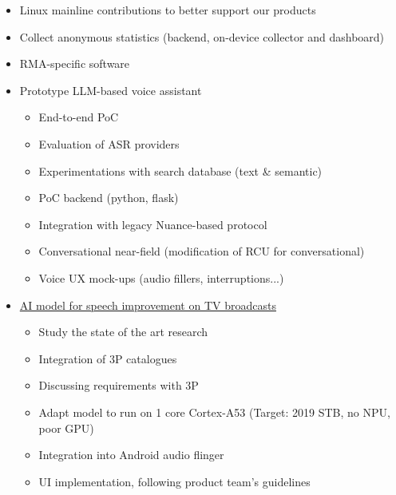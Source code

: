 \documentclass[12pt,a4paper,sans]{moderncv}        %
\begin{document}
{\begin{itemize}
        \item Linux mainline contributions to better support our products
        \item Collect anonymous statistics (backend, on-device collector and dashboard)
        \item RMA-specific software
        \item Prototype LLM-based voice assistant
            \begin{itemize}
                \item End-to-end PoC
                \item Evaluation of ASR providers
                \item Experimentations with search database (text \& semantic)
                \item PoC backend (python, flask)
                \item Integration with legacy Nuance-based protocol
                \item Conversational near-field (modification of RCU for conversational)
                \item Voice UX mock-ups (audio fillers, interruptions...)
            \end{itemize}
        \item \href{https://github.com/phhusson/speechseparation}{AI model for speech improvement on TV broadcasts}
            \begin{itemize}
                \item Study the state of the art research
                \item Integration of 3P catalogues
                \item Discussing requirements with 3P
                \item Adapt model to run on 1 core Cortex-A53 (Target: 2019 STB, no NPU, poor GPU)
                \item Integration into Android audio flinger
                \item UI implementation, following product team's guidelines
            \end{itemize}
	\end{itemize}
}
\end{document}
